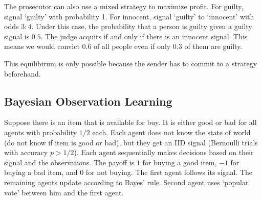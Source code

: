 The prosecutor can also use a mixed strategy to maximize profit. For guilty, signal `guilty' with probability 1. For innocent, signal `guilty' to `innocent' with odds $3:4$. Under this case, the probability that a person is guilty given a guilty signal is $0.5$. The judge acquits if and only if there is an innocent signal. This means we would convict $0.6$ of all people even if only $0.3$ of them are guilty.

\begin{remark}
    This equilibirum is only possible because the sender has to commit to a strategy beforehand.
\end{remark}

\subsection*{Bayesian Observation Learning}
Suppose there is an item that is available for buy. It is either good or bad for all agents with probability $1/2$ each. Each agent does not know the state of world (do not know if item is good or bad), but they get an IID signal (Bernoulli trials with accuracy $p>1/2$).
Each agent sequentially makes decisions based on their signal and the observations.
The payoff is $1$ for buying a good item, $-1$ for buying a bad item, and $0$ for not buying.
The first agent follows its signal. The remaining agents update according to Bayes' rule. Second agent uses `popular vote' between him and the first agent.